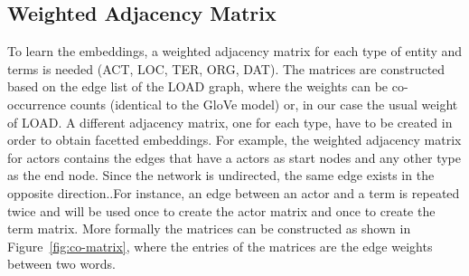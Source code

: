 \subsection{Weighted Adjacency Matrix}\label{sec:adj_matrix}
To learn the embeddings, a weighted adjacency matrix for each type of entity and terms is needed (ACT, LOC, TER, ORG, DAT). The matrices are constructed based on the edge list of the LOAD graph, where the weights can be co-occurrence counts (identical to the GloVe model) or, in our case the usual weight of LOAD. A different adjacency matrix, one for each type, have to be created in order to obtain facetted embeddings. For example, the weighted adjacency matrix for actors contains the edges that have a actors as start nodes and any other type as the end node. Since the network is undirected, the same edge exists in the opposite direction..For instance, an edge between an actor and a term is repeated twice and will be used once to create the actor matrix and once to create the term matrix. More formally the matrices can be constructed as shown in Figure~\ref{fig:co-matrix}, where the entries of the matrices are the edge weights between two words.  
